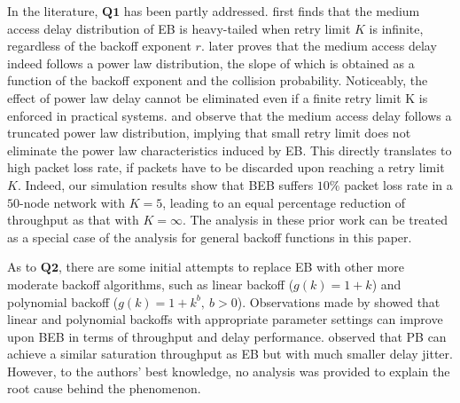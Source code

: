 \documentclass[journal]{IEEEtran}
\begin{document}
In the literature, $\textbf{Q1}$ has been partly addressed. \cite{2007:Sakurai} first finds that the medium access delay distribution of EB is heavy-tailed when retry limit $K$ is infinite, regardless of the backoff exponent $r$. \cite{2009:Cho} later proves that the medium access delay indeed follows a power law distribution, the slope of which is obtained as a function of the backoff exponent and the collision probability. Noticeably, the effect of power law delay cannot be eliminated even if a finite retry limit K is enforced in practical systems. \cite{2009:Cho} and \cite{2007:Sakurai} observe that the medium access delay follows a truncated power law distribution, implying that small retry limit does not eliminate the power law characteristics induced by EB. This directly translates to high packet loss rate, if packets have to be discarded upon reaching a retry limit $K$. Indeed, our simulation results show that BEB suffers $10\%$ packet loss rate in a $50$-node network with $K=5$, leading to an equal percentage reduction of throughput as that with $K=\infty$. The analysis in these prior work can be treated as a special case of the analysis for general backoff functions in this paper.

As to $\textbf{Q2}$, there are some initial attempts to replace EB with other more moderate backoff algorithms, such as linear backoff ($g(k)=1+k$) and polynomial backoff ($g(k)=1+k^b,\ b>0$)\cite{1987:Hastad,2008:Xu,2011:Sun}. Observations made by \cite{2008:Xu} showed that linear and polynomial backoffs with appropriate parameter settings can improve upon BEB in terms of throughput and delay performance. \cite{2011:Sun} observed that PB can achieve a similar saturation throughput as EB but with much smaller delay jitter. However, to the authors' best knowledge, no analysis was provided to explain the root cause behind the phenomenon.
\end{document}
